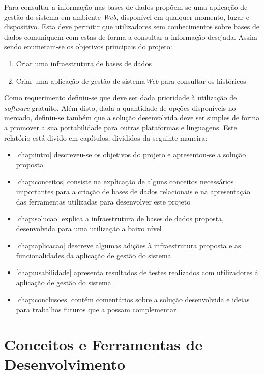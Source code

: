 \documentclass[11pt,twoside,a4paper]{report}
\begin{document}
Para consultar a informação nas bases de dados propõem-se uma aplicação de gestão do sistema em ambiente \textit{Web}, disponível em qualquer momento, lugar e dispositivo. Esta deve permitir que utilizadores sem conhecimentos sobre bases de dados comuniquem com estas de forma a consultar a informação desejada. Assim sendo enumeram-se os objetivos principais do projeto:
\begin{enumerate}
	\item Criar uma infraestrutura de bases de dados
	\item Criar uma aplicação de gestão de sistema\textit{Web} para consultar os históricos
\end{enumerate}
Como requerimento definiu-se que deve ser dada prioridade à utilização de \textit{software} gratuito. Além disto, dada a quantidade de opções disponíveis no mercado, definiu-se também que a solução desenvolvida deve ser simples de forma a promover a sua portabilidade para outras plataformas e linguagens.
\newpage
Este relatório está divido em capítulos, divididos da seguinte maneira:
\begin{itemize}
	\item \autoref{chap:intro} descreveu-se os objetivos do projeto e apresentou-se a solução proposta
	\item \autoref{chap:conceitos} consiste na explicação de alguns conceitos necessários importantes para a criação de bases de dados relacionais e na apresentação das ferramentas utilizadas para desenvolver este projeto
	\item \autoref{chap:solucao} explica a infraestrutura de bases de dados proposta, desenvolvida para uma utilização a baixo nível
	\item \autoref{chap:aplicacao} descreve algumas adições à infraestrutura proposta e as funcionalidades da aplicação de gestão do sistema
	\item \autoref{chap:usabilidade} apresenta resultados de testes realizados com utilizadores à aplicação de gestão do sistema
	\item \autoref{chap:conclusoes} contém comentários sobre a solução desenvolvida e ideias para trabalhos futuros que a possam complementar
\end{itemize}

\cleardoublepage
\chapter{Conceitos e Ferramentas de Desenvolvimento}
\label{chap:conceitos}
\end{document}
